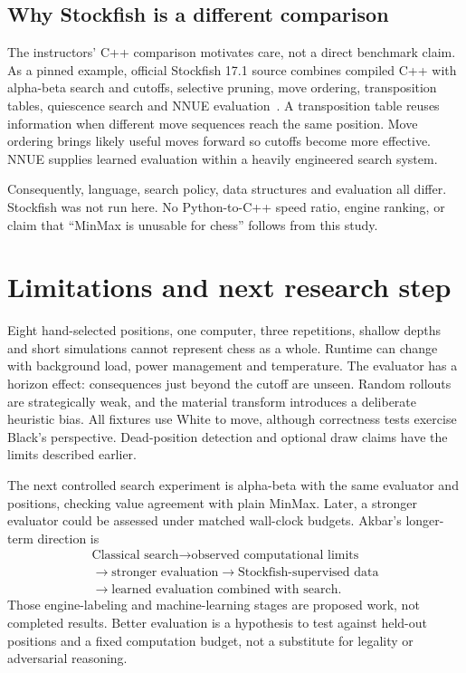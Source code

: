 \documentclass[10pt,letterpaper]{article}
\begin{document}
\subsection{Why Stockfish is a different comparison}
The instructors' C++ comparison motivates care, not a direct benchmark claim. As a pinned example, official Stockfish 17.1 source combines compiled C++ with alpha-beta search and cutoffs, selective pruning, move ordering, transposition tables, quiescence search and NNUE evaluation~\cite{stockfish2025}. A transposition table reuses information when different move sequences reach the same position. Move ordering brings likely useful moves forward so cutoffs become more effective. NNUE supplies learned evaluation within a heavily engineered search system.

Consequently, language, search policy, data structures and evaluation all differ. Stockfish was not run here. No Python-to-C++ speed ratio, engine ranking, or claim that ``MinMax is unusable for chess'' follows from this study.

\section{Limitations and next research step}
Eight hand-selected positions, one computer, three repetitions, shallow depths and short simulations cannot represent chess as a whole. Runtime can change with background load, power management and temperature. The evaluator has a horizon effect: consequences just beyond the cutoff are unseen. Random rollouts are strategically weak, and the material transform introduces a deliberate heuristic bias. All fixtures use White to move, although correctness tests exercise Black's perspective. Dead-position detection and optional draw claims have the limits described earlier.

The next controlled search experiment is alpha-beta with the same evaluator and positions, checking value agreement with plain MinMax. Later, a stronger evaluator could be assessed under matched wall-clock budgets. Akbar's longer-term direction is
\[
\begin{gathered}
\text{Classical search}\longrightarrow\text{observed computational limits}\\
\longrightarrow\text{stronger evaluation}\longrightarrow\text{Stockfish-supervised data}\\
\longrightarrow\text{learned evaluation combined with search}.
\end{gathered}
\]
Those engine-labeling and machine-learning stages are proposed work, not completed results. Better evaluation is a hypothesis to test against held-out positions and a fixed computation budget, not a substitute for legality or adversarial reasoning.
\end{document}
